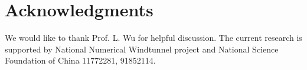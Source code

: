 \documentclass[3p,12pt]{elsarticle}
\begin{document}
	
	\section*{Acknowledgments}
	We would like to thank Prof. L. Wu for helpful discussion.
	The current research is supported by National Numerical Windtunnel project and  National Science Foundation of China 11772281, 91852114.
	
	
	
	
	
	
	\clearpage
	
\end{document}
